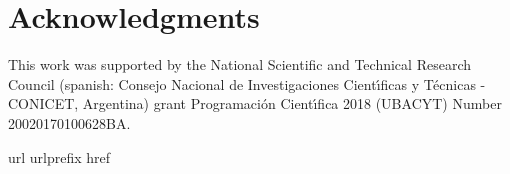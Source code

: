 \documentclass[preprint,12pt]{elsarticle}
\begin{document}
\section*{Acknowledgments}
This work was supported by the National Scientific and Technical 
Research Council (spanish: Consejo Nacional de Investigaciones Cient\'\i ficas 
y T\'ecnicas - CONICET, Argentina) grant Programaci\'on Cient\'\i fica 2018 (UBACYT) Number 20020170100628BA.

\appendix



\begin{thebibliography}{10}
\expandafter\ifx\csname url\endcsname\relax
  \def\url#1{\texttt{#1}}\fi
\expandafter\ifx\csname urlprefix\endcsname\relax\def\urlprefix{URL }\fi
\expandafter\ifx\csname href\endcsname\relax
  \def\href#1#2{#2} \def\path#1{#1}\fi


\end{thebibliography}
\end{document}
